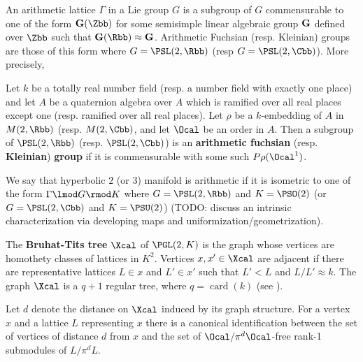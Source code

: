  An arithmetic lattice $\Gamma$ in a Lie group $G$ is a subgroup of $G$ commensurable to one of the form $\bf{G}(\Zbb)$ for some semisimple linear algebraic group $\bf{G}$ defined over $\Zbb$ such that $\bf{G}(\Rbb) \approx G$. Arithmetic Fuchsian (resp. Kleinian) groups are those of this form where $G = \PSL(2,\Rbb)$ (resp $G= \PSL(2,\Cbb)$). More precisely,

 \begin{definition}\label{def:arithFuchsianKleinian}
	 Let $k$ be a totally real number field (resp. a number field with exactly one place) and let $A$ be a quaternion algebra over $A$ which is ramified over all real places except one (resp. ramified over all real places). Let $\rho$ be a $k$-embedding of $A$ in $M(2,\Rbb)$ (resp. $M(2,\Cbb)$, and let $\Ocal$ be an order in $A$. Then a subgroup of $\PSL(2,\Rbb)$ (resp. $\PSL(2,\Cbb)$) is an \textbf{arithmetic fuchsian} (resp. \textbf{Kleinian})\textbf{ group} if it is commensurable with some such $P\rho(\Ocal^1)$.
 \end{definition}

 We say that  hyperbolic $2$ (or $3$) manifold is arithmetic if it is isometric to one of the form $\Gamma \lmod G \rmod K$ where $G= \PSL(2,\Rbb)$ and $K = \PSO(2)$ (or $G= \PSL(2,\Cbb)$ and $K = \PSU(2)$) (TODO: discuss an intrinsic characterization via developing maps and uniformization/geometrization).






 The \textbf{Bruhat-Tits tree} $\Xcal$ of $\PGL(2,K)$ is the graph whose vertices are homothety classes of lattices in $K^2$. Vertices $x,x' \in \Xcal$ are adjacent if there are representative lattices $L \in x$ and $L' \in x'$ such that $L' < L$ and $L/L' \approx k$.  The graph $\Xcal$ is a $q+1$ regular tree, where $q = \operatorname{card}(k)$ (see \cite{serreTrees2003}).

 Let $d$ denote the distance on $\Xcal$ induced by its graph structure. For a vertex $x$ and a lattice $L$ representing $x$ there is a canonical identification between the set of vertices of distance $d$ from $x$ and the set of $\Ocal/\pi^d \Ocal$-free rank-1 submodules of $L / \pi^d L$.

